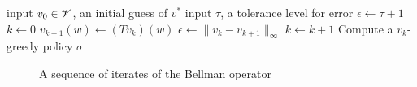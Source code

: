 \begin{frame}

    {\small 
        \begin{algorithm}[H]
        \DontPrintSemicolon
        input $v_0 \in \mathscr V$, an initial guess of $v^*$ \;
        input $\tau$, a tolerance level for error \;
        $\epsilon \leftarrow \tau + 1$ \;
        $k \leftarrow 0$ \;
        \While{$\epsilon > \tau $}
        {
            {
                $v_{k+1}(w) \leftarrow (Tv_k) (w)$ \;
            }
            $\epsilon \leftarrow \| v_k - v_{k+1} \|_\infty$ \;
            $k \leftarrow k + 1$ \;
        }
        Compute a $v_k$-greedy policy $\sigma$ \;
        \Return{$\sigma$}
    \end{algorithm}
    }


\end{frame}


\begin{frame}
    
    \begin{figure}
        \centering
        \caption{\label{f:iid_job_search_1} A sequence of iterates of the Bellman operator}
    \end{figure}


\end{frame}

